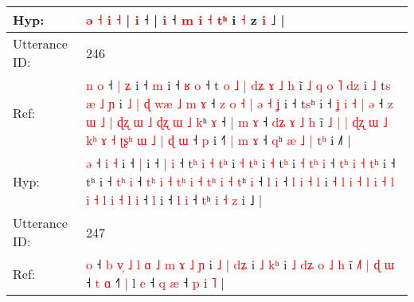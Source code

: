\documentclass[10pt]{article}
\DeclareRobustCommand{\hl}[1]{{\textcolor{red}{#1}}}
\begin{document}
\begin{longtable}{ll}
 \\
Hyp: & \hl{}\hl{}\hl{}\hl{}\hl{ə} \hl{˧} \hl{i} \hl{˧} |\hl{}\hl{}\hl{}\hl{}\hl{}\hl{}\hl{}\hl{}\hl{}\hl{} \hl{i} ˧ |\hl{}\hl{} \hl{i} ˧\hl{}\hl{}\hl{}\hl{}\hl{} \hl{m} \hl{i} \hl{˧} \hl{}\hl{t}\hl{ʰ} i \hl{˧} z \hl{i} ˩ |
 \\
\midrule
Utterance ID: & 246 \\
Ref: & \hl{n}\hl{ }\hl{o} ˧ \hl{|} \hl{ʑ} i ˧ \hl{m} i ˧ \hl{ʁ} \hl{o} ˧ t\hl{ }\hl{o}\hl{ }\hl{˩}\hl{ }\hl{|} \hl{d}\hl{ʑ} \hl{ɤ} \hl{˩}\hl{ }\hl{h} i\hl{̃}\hl{ }\hl{˩}\hl{ }\hl{q}\hl{ }\hl{o} \hl{˥} \hl{d}\hl{z} i \hl{˩} t\hl{s}\hl{ }\hl{æ}\hl{ }\hl{˩}\hl{ }\hl{ɲ} i\hl{ }\hl{˩}\hl{ }\hl{|}\hl{ }\hl{ɖ} \hl{w}\hl{æ} \hl{˩}\hl{ }\hl{m} \hl{ɤ} ˧\hl{ }\hl{z} \hl{o}\hl{ }\hl{˧} \hl{|} \hl{ə} \hl{˧}\hl{ }\hl{ʝ} i ˧ t\hl{s}ʰ i ˧\hl{ }\hl{ʝ}\hl{ }\hl{i} \hl{˧}\hl{ }\hl{|} \hl{ə} ˧ \hl{z}\hl{ }\hl{ɯ} \hl{˩} \hl{|} \hl{ɖ}\hl{ʐ} \hl{ɯ} \hl{˩} \hl{ɖ}\hl{ʐ} \hl{ɯ} \hl{˩} \hl{k}ʰ \hl{ɤ} ˧\hl{ }\hl{|} \hl{m} \hl{ɤ} ˧ \hl{d}\hl{ʑ} \hl{ɤ} \hl{˩} \hl{h} i\hl{̃} \hl{˩} \hl{|} \hl{|} \hl{ɖ}\hl{ʐ} \hl{ɯ} \hl{˩} \hl{k}\hl{ʰ} \hl{ɤ} \hl{˧} \hl{ʈ}\hl{ʂ}\hl{ʰ} \hl{ɯ} \hl{˩} \hl{|} \hl{ɖ} \hl{ɯ} ˧ \hl{p} i ˧\hl{˥}\hl{ }\hl{|} \hl{m} \hl{ɤ} ˧ \hl{q}ʰ\hl{ }\hl{æ} \hl{˩} \hl{|} \hl{t}\hl{ʰ} i ˩\hl{˥} |
 \\
Hyp: & \hl{}\hl{}\hl{ə} ˧ \hl{i} \hl{˧} i ˧ \hl{|} i ˧ \hl{|} \hl{i} ˧ t\hl{}\hl{}\hl{}\hl{}\hl{}\hl{ʰ} \hl{}\hl{i} \hl{˧} \hl{}\hl{t}\hl{ʰ} i\hl{}\hl{}\hl{}\hl{}\hl{}\hl{}\hl{} \hl{˧} \hl{t}\hl{ʰ} i \hl{˧} t\hl{}\hl{}\hl{}\hl{}\hl{}\hl{}\hl{ʰ} i\hl{}\hl{}\hl{}\hl{}\hl{}\hl{} \hl{}\hl{˧} \hl{}\hl{t}\hl{ʰ} \hl{i} ˧\hl{}\hl{} \hl{}\hl{t}\hl{ʰ} \hl{i} \hl{˧} \hl{}\hl{t}\hl{ʰ} i ˧ t\hl{}ʰ i ˧\hl{}\hl{}\hl{}\hl{} \hl{}\hl{t}\hl{ʰ} \hl{i} ˧ \hl{}\hl{t}\hl{ʰ} \hl{i} \hl{˧} \hl{t}\hl{ʰ} \hl{i} \hl{˧} \hl{t}\hl{ʰ} \hl{i} \hl{˧} \hl{t}ʰ \hl{i} ˧\hl{}\hl{} \hl{l} \hl{i} ˧ \hl{}\hl{l} \hl{i} \hl{˧} \hl{l} i\hl{} \hl{˧} \hl{l} \hl{i} \hl{}\hl{˧} \hl{l} \hl{i} \hl{}\hl{˧} \hl{l} \hl{i} \hl{}\hl{}\hl{˧} \hl{l} \hl{i} \hl{˧} \hl{l} \hl{i} ˧ \hl{l} i ˧\hl{}\hl{}\hl{} \hl{l} \hl{i} ˧ \hl{t}ʰ\hl{}\hl{} \hl{i} \hl{˧} \hl{}\hl{z} i ˩\hl{} |
 \\
\midrule
Utterance ID: & 247 \\
Ref: & \hl{o} ˧\hl{ }\hl{b}\hl{ }\hl{v}\hl{̩}\hl{ }\hl{˩}\hl{ }\hl{l}\hl{ }\hl{ɑ}\hl{ }\hl{˩}\hl{ }\hl{m}\hl{ }\hl{ɤ} \hl{˩} \hl{ɲ} i \hl{˩} |\hl{ }\hl{d}\hl{ʑ} i \hl{˩} \hl{k}\hl{ʰ} i \hl{˩} \hl{d}\hl{ʑ} \hl{o} \hl{˩} \hl{h} i\hl{̃}\hl{ }\hl{˩}\hl{˥} \hl{|} \hl{ɖ} \hl{ɯ} ˧ \hl{t} \hl{ɑ} ˧\hl{˥}\hl{ }\hl{|} l \hl{e} ˧ \hl{}\hl{q} \hl{æ} ˧ \hl{p} i \hl{˥} |

\end{longtable}
\end{document}
